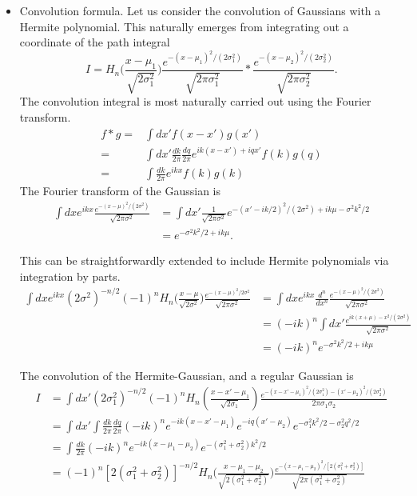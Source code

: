 \begin{itemize}
    \item Convolution formula.  Let us consider the convolution of Gaussians with a Hermite 
    polynomial.  This naturally emerges from integrating out a coordinate of the path integral
    \begin{equation}
      I = H_n\big(\frac{x-\mu_1}{\sqrt{2\sigma_1^2}}\big) \frac{e^{-(x-\mu_1)^2/(2\sigma_1^2)}}{\sqrt{2\pi \sigma_1^2}} 
      * \frac{e^{-(x-\mu_2)^2/(2\sigma_2^2)}}{\sqrt{2\pi \sigma_2^2}}.
    \end{equation}
    The convolution integral is most naturally carried out using the Fourier transform.
    \begin{align}
      f*g =& \int dx' f(x-x')g(x')\\
      = & \int dx' \frac{dk}{2\pi} \frac{dq}{2\pi} e^{ik(x-x')+iqx'} f(k)g(q)\\
      = & \int \frac{dk}{2\pi} e^{ikx} f(k)g(k)
    \end{align}
    The Fourier transform of the Gaussian is 
    \begin{align}
      \int dx e^{ikx}\frac{e^{-(x-\mu)^2/(2\sigma^2)}}{\sqrt{2\pi \sigma^2}} 
      &= \int dx' \frac{1}{\sqrt{2\pi\sigma^2}}e^{-(x'-ik/2)^2/(2\sigma^2)+ik\mu-\sigma^2k^2/2}\\
      &= e^{-\sigma^2 k^2/2+ik\mu}.
    \end{align}

    This can be straightforwardly extended to include Hermite polynomials via integration by parts.
    \begin{align}
      \int dx e^{ikx}(2\sigma^2)^{-n/2}(-1)^n H_n\big(\frac{x-\mu}{\sqrt{2\sigma^2}}\big)
        \frac{e^{-(x-\mu)^2/2\sigma^2}}{\sqrt{2\pi \sigma^2}} 
      &= \int dx e^{ikx}\frac{d^n}{dx^n}\frac{e^{-(x-\mu)^2/(2\sigma^2)}}{\sqrt{2\pi \sigma^2}}\\
      &= (-ik)^n\int dx' \frac{e^{ik(x+\mu)-x^2/(2\sigma^2)}}{\sqrt{2\pi \sigma^2}}\\
      &= (-ik)^ne^{-\sigma^2 k^2/2+ik\mu}
    \end{align}

    The convolution of the Hermite-Gaussian, and a regular Gaussian is 
    \begin{align}
      I&=\int dx' (2\sigma_1^2)^{-n/2}(-1)^n H_n\left(\frac{x-x'-\mu_1}{\sqrt{2\sigma_1}}\right)
      \frac{e^{-(x-x'-\mu_1)^2/(2\sigma_1^2)-(x'-\mu_2)^2/(2\sigma_2^2)}}{2\pi \sigma_1 \sigma_2}\\
      &=\int dx' \int \frac{dk}{2\pi}\frac{dq}{2\pi} (-ik)^n e^{-ik(x-x'-\mu_1)}e^{-iq(x'-\mu_2)}
      e^{-\sigma_1^2k^2/2-\sigma_2^2q^2/2}\\
      &=\int \frac{dk}{2\pi}(-ik)^ne^{-ik(x-\mu_1-\mu_2)}e^{-(\sigma_1^2+\sigma_2^2)k^2/2}\\
      &=(-1)^n[2(\sigma_1^2+\sigma_2^2)]^{-n/2}H_n\bigg(\frac{x-\mu_1-\mu_2}{\sqrt{2(\sigma_1^2+\sigma_2^2)}}\bigg)
      \frac{e^{-(x-\mu_1-\mu_2)^2/[2(\sigma_1^2+\sigma_2^2)]}}{\sqrt{2\pi(\sigma_1^2+\sigma_2^2)}}
    \end{align}


\end{itemize}
